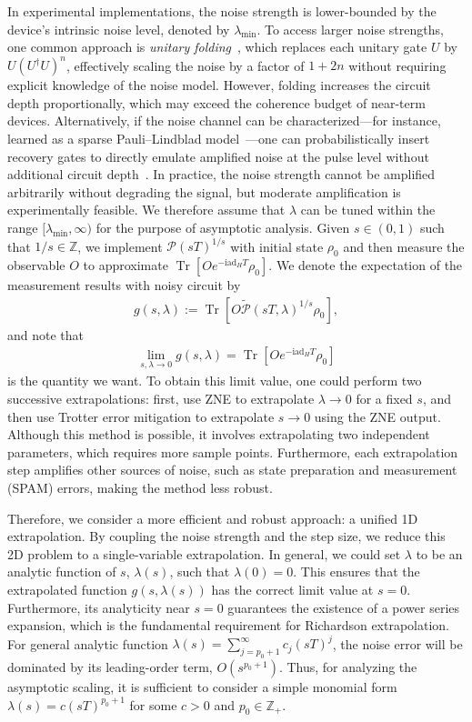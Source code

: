 \documentclass[aps,pra,reprint,groupedaddress,floatfix]{revtex4-2}
\renewcommand{\i}{\mathrm{i}}
\newcommand{\ad}{\mathrm{ad}}
\newcommand{\mc}{\mathcal}
\newcommand{\mb}{\mathbb}
\begin{document}
In experimental implementations, the noise strength is lower-bounded by the device's intrinsic noise level, denoted by $\lambda_{\min}$. To access larger noise strengths, one common approach is \textit{unitary folding}~\cite{giurgica-tiron_digital_2020}, which replaces each unitary gate $U$ by $U(U^\dagger U)^n$, effectively scaling the noise by a factor of $1+2n$ without requiring explicit knowledge of the noise model. However, folding increases the circuit depth proportionally, which may exceed the coherence budget of near-term devices.
Alternatively, if the noise channel can be characterized---for instance, learned as a sparse Pauli--Lindblad model~\cite{berg_probabilistic_2023}---one can probabilistically insert recovery gates to directly emulate amplified noise at the pulse level without additional circuit depth~\cite{li2017efficient}. In practice, the noise strength cannot be amplified arbitrarily without degrading the signal, but moderate amplification is experimentally feasible. We therefore assume that $\lambda$ can be tuned within the range $[\lambda_{\min}, \infty)$ for the purpose of asymptotic analysis.
Given $s\in (0,1)$ such that $1/s\in \mathbb{Z}$, we implement $\mc P(sT)^{1/s}$ with initial state $\rho_0$ and then measure the observable $O$ to approximate $\operatorname{Tr}[Oe^{-\i \ad_H T}\rho_0]$. We denote the expectation of the measurement results with noisy circuit by  \begin{align*}
    g(s,\lambda) := \operatorname{Tr}[O\tilde{\mc P}(sT,\lambda)^{1/s}\rho_0],
\end{align*}
and note that \begin{align*}
    \lim_{s,\lambda\to 0} g(s,\lambda) = \operatorname{Tr}[Oe^{-\i \ad_H T}\rho_0]
\end{align*}
is the quantity we want. To obtain this limit value, one could perform two successive extrapolations: first, use ZNE to extrapolate $\lambda \to 0$ for a fixed $s$, and then use Trotter error mitigation \cite{watson2025exponentially} to extrapolate $s \to 0$ using the ZNE output. Although this method is possible, it involves extrapolating two independent parameters, which requires more sample points. Furthermore, each extrapolation step amplifies other sources of noise, such as state preparation and measurement (SPAM) errors, making the method less robust.

Therefore, we consider a more efficient and robust approach: a unified 1D extrapolation. By coupling the noise strength and the step size, we reduce this 2D problem to a single-variable extrapolation. In general, we could set $\lambda$ to be an analytic function of $s$, $\lambda(s)$, such that $\lambda(0)=0$. This ensures that the extrapolated function $g(s,\lambda(s))$ has the correct limit value at $s = 0$. Furthermore, its analyticity near $s=0$ guarantees the existence of a power series expansion, which is the fundamental requirement for Richardson extrapolation. For general analytic function $\lambda(s) =\sum_{j=p_0+1}^{\infty} c_j (sT)^j$, the noise error will be dominated by its leading-order term, $O(s^{p_0+1})$. Thus, for analyzing the asymptotic scaling, it is sufficient to consider a simple monomial form  $\lambda(s) = c(sT)^{p_0+1}$ for some $c>0$ and $p_0\in \mb{Z}_+$.
\end{document}
